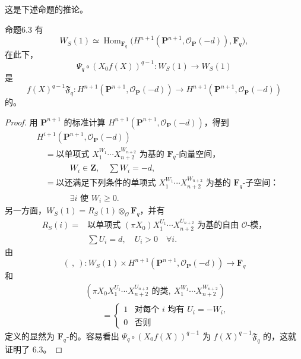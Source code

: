 这是下述命题的推论。
\begin{SGAresult}{命题}{6.3}
有
\[
W_S(1)\simeq\operatorname{Hom}_{\mathbf F_q}
\bigl(H^{n+1}(\mathbf P^{n+1},\mathscr O_{\mathbf P}(-d)),\mathbf F_q\bigr),\tag{6.3.1}
\]
在此下，
\[
\Psi_q\circ(X_0f(X))^{q-1}:W_S(1)\longrightarrow W_S(1)\tag{6.3.2}
\]
是
\[
f(X)^{q-1}\mathfrak F_q:
H^{n+1}(\mathbf P^{n+1},\mathscr O_{\mathbf P}(-d))
\longrightarrow H^{n+1}(\mathbf P^{n+1},\mathscr O_{\mathbf P}(-d))\tag{6.3.3}
\]
的。
\end{SGAresult}
\begin{proof}
用 $\mathbf P^{n+1}$ 的标准计算 $H^{n+1}(\mathbf P^{n+1},\mathscr O_{\mathbf P}(-d))$，得到
\[
\begin{aligned}
{}&H^{i+1}(\mathbf P^{n+1},\mathscr O_{\mathbf P}(-d))\\
&\quad=\text{以单项式 }X_1^{W_1}\cdots X_{n+2}^{W_{n+2}}\text{ 为基的 }\mathbf F_q\text{-向量空间，}\\
&\qquad\qquad W_i\in\mathbf Z,\quad\sum W_i=-d,\\
&\quad=\text{以还满足下列条件的单项式 }X_1^{W_1}\cdots X_{n+2}^{W_{n+2}}
\text{ 为基的 }\mathbf F_q\text{-子空间：}\\
&\qquad\qquad\exists i\text{ 使 }W_i\ge0.
\end{aligned}\tag{6.3.4}
\]
另一方面，$W_S(1)=R_S(1)\otimes_{\mathscr O}\mathbf F_q$，并有
\[
\begin{split}
R_S(i)={}&\text{以单项式 }(\pi X_0)X_1^{U_1}\cdots X_{n+2}^{U_{n+2}}
\text{ 为基的自由 }\mathscr O\text{-模，}\\
&\sum U_i=d,\quad U_i>0\quad\forall i.
\end{split}\tag{6.3.5}
\]
由
\[
(\ ,\ ):W_S(1)\times H^{n+1}(\mathbf P^{n+1},\mathscr O_{\mathbf P}(-d))
\longrightarrow\mathbf F_q\tag{6.3.6}
\]
和
\[
\begin{split}
&\left(\pi X_0X_1^{U_1}\cdots X_{n+2}^{U_{n+2}}\text{ 的类},\ X_1^{W_1}\cdots X_{n+2}^{W_{n+2}}\right)\\
&\qquad=\begin{cases}1&\text{对每个 }i\text{ 均有 }U_i=-W_i,\\0&\text{否则}\end{cases}
\end{split}\tag{6.3.7}
\]
定义的显然为 $\mathbf F_q$-的。容易看出 $\Psi_q\circ(X_0f(X))^{q-1}$ 为 $f(X)^{q-1}\mathfrak F_q$ 的，这就证明了 6.3。
\end{proof}
